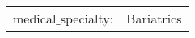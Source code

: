 \begin{table}[h]
\begin{tabularx}{\textwidth}{|l|X|}
        medical$\_$specialty: & Bariatrics                                                                                                                                                                                                                                                                                                                                                                                                                                                                                                                                                                                                                                                                                                                                                                                                                                                                                                                                                                                                                                                                                                                                                                                                                                                                                                                                                                                                                                                                                                                                                                                                                                                                                                                                           \\

\end{tabularx}
\end{table}
